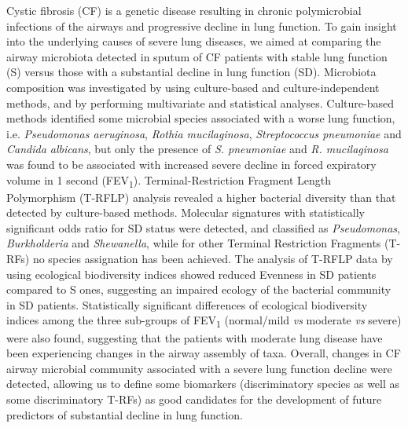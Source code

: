 Cystic fibrosis (CF) is a genetic disease resulting in chronic polymicrobial infections of the airways and progressive decline in lung function. To gain insight into the underlying causes of severe lung diseases, we aimed at comparing the airway microbiota detected in sputum of CF patients with stable lung function (S) versus those with a substantial decline in lung function (SD). Microbiota composition was investigated by using culture-based and culture-independent methods, and by performing multivariate and statistical analyses. Culture-based methods identified some microbial species associated with a worse lung function, i.e. \textit{Pseudomonas aeruginosa}, \textit{Rothia mucilaginosa}, \textit{Streptococcus pneumoniae }and \textit{Candida albicans}, but only the presence of \textit{S. pneumoniae }and \textit{R. mucilaginosa }was found to be associated with increased severe decline in forced expiratory volume in 1 second (FEV\textsubscript{1}). Terminal-Restriction Fragment Length Polymorphism (T-RFLP) analysis revealed a higher bacterial diversity than that detected by culture-based methods. Molecular signatures with statistically significant odds ratio for SD status were detected, and classified as \textit{Pseudomonas}, \textit{Burkholderia} and \textit{Shewanella}, while for other Terminal Restriction Fragments (T-RFs) no species assignation has been achieved. The analysis of T-RFLP data by using ecological biodiversity indices showed reduced Evenness in SD patients compared to S ones, suggesting an impaired ecology of the bacterial community in SD patients. Statistically significant differences of ecological biodiversity indices among the three sub-groups of FEV\textsubscript{1 }(normal/mild \textit{vs} moderate \textit{vs} severe) were also found, suggesting that the patients with moderate lung disease have been experiencing changes in the airway assembly of taxa. Overall, changes in CF airway microbial community associated with a severe lung function decline were detected, allowing us to define some biomarkers (discriminatory species as well as some discriminatory T-RFs) as good candidates for the development of future predictors of substantial decline in lung function.\\

